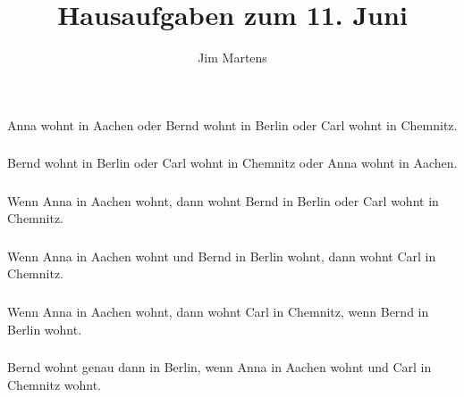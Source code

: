 \documentclass[10pt,a4paper,oneside,ngerman,numbers=noenddot]{scrartcl}
\begin{document}
\author{Jim Martens}
\title{Hausaufgaben zum 11. Juni}
\maketitle

\section{} %
\subsection{} %
\subsubsection{} %
Anna wohnt in Aachen oder Bernd wohnt in Berlin oder Carl wohnt in Chemnitz.
\subsubsection{} %
Bernd wohnt in Berlin oder Carl wohnt in Chemnitz oder Anna wohnt in Aachen.
\subsubsection{} %
Wenn Anna in Aachen wohnt, dann wohnt Bernd in Berlin oder Carl wohnt in Chemnitz.
\subsubsection{} %
Wenn Anna in Aachen wohnt und Bernd in Berlin wohnt, dann wohnt Carl in Chemnitz.
\subsubsection{} %
Wenn Anna in Aachen wohnt, dann wohnt Carl in Chemnitz, wenn Bernd in Berlin wohnt.
\subsubsection{} %
Bernd wohnt genau dann in Berlin, wenn Anna in Aachen wohnt und Carl in Chemnitz wohnt.
\end{document}
